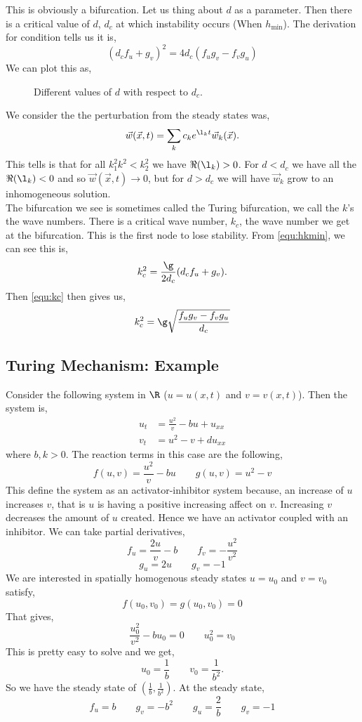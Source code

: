 \noindent
This is obviously a bifurcation. Let us thing about $d$ as a parameter. Then there is a critical value of $d$, $d_c$ at which instability occurs (When $h_{\text{min}}$). The derivation for condition  tells us it is,
\begin{equation}
  (d_cf_u + g_v)^2 = 4d_c (f_ug_v - f_vg_u)\label{equ:kc}
\end{equation}
We can plot this as,

\begin{figure}[!ht]
\centering
\resizebox{0.6\textwidth}{!}{}
\caption{Different values of $d$ with respect to $d_c$.}
\end{figure}

\noindent
We consider the the perturbation from the steady states was,
$$ \vec w(\vec x, t) = \sum_k c_k e^{\l_k t} \vec w_k (\vec x). $$
This tells is that for all $k_1^2 k^2 < k_2^2$ we have $\Re(\l_k) > 0$. For $d < d_c$ we have all the $\Re(\l_k) < 0$ and so $\vec w(\vec x, t) \to 0$, but for $d > d_c$ we will have $\vec w_k$ grow to an inhomogeneous solution.\\

\noindent
The bifurcation we see is sometimes called the Turing bifurcation, we call the $k$'s the wave numbers. There is a critical wave number, $k_c$, the wave number we get at the bifurcation. This is the first node to lose stability. From \ref{equ:hkmin}, we can see this is,
$$ k_c ^2 = \frac{\g}{2d_c} (d_c f_u + g_v). $$
Then \ref{equ:kc} then gives us,
$$ k_c^2 = \g\sqrt{\frac{f_ug_v - f_vg_u}{d_c}} $$

\subsection{Turing Mechanism: Example}
Consider the following system in $\R$ ($u = u(x, t)$ and $v = v(x, t)$). Then the system is,
\begin{align*}
  u_t &= \frac{u^2}{v} - bu + u_{xx} \\
  v_t &= u^2 - v + du_{xx}
\end{align*}
where $b, k > 0$. The reaction terms in this case are the following,
$$ f(u,v) = \frac{u^2}{v} - bu \qquad g(u, v) = u^2 - v $$
This define the system as an activator-inhibitor system because, an increase of $u$ increases $v$, that is $u$ is having a positive increasing affect on $v$. Increasing $v$ decreases the amount of $u$ created. Hence we have an activator coupled with an inhibitor. We can take partial derivatives,
$$ f_u = \frac{2u}{v} - b \qquad f_v = - \frac{u^2}{v^2} $$
$$ g_u = 2u \qquad g_v = -1 $$
We are interested in spatially homogenous steady states $u = u_0$ and $v = v_0$ satisfy,
$$ f(u_0, v_0) = g(u_0, v_0) = 0 $$
That gives,
$$ \frac{u_0^2}{v^2} - bu_0 = 0 \qquad u_0^2 = v_0 $$
This is pretty easy to solve and we get,
$$ u_0 = \frac{1}{b} \qquad v_0 = \frac{1}{b^2}.$$
So we have the steady state of $\left( \frac{1}{b}, \frac{1}{b^2}\right)$. At the steady state,
$$ f_u = b \qquad g_v = -b^2 \qquad g_u = \frac{2}{b} \qquad g_v = -1  $$

